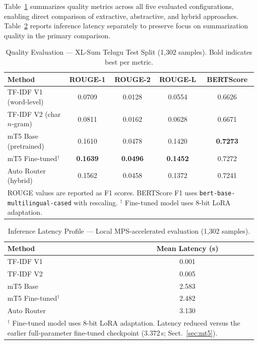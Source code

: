 \documentclass[runningheads]{llncs}
\begin{document}
Table~\ref{tab:main} summarizes quality metrics across all
five evaluated configurations, enabling direct comparison
of extractive, abstractive, and hybrid approaches.
Table~\ref{tab:latency} reports inference latency
separately to preserve focus on summarization quality in
the primary comparison.

\begin{table}[!htbp]
\centering
\caption{Quality Evaluation --- XL-Sum Telugu Test Split
(1,302 samples). Bold indicates best per metric.}
\label{tab:main}
\scriptsize
\setlength{\tabcolsep}{3.5pt}
\begin{tabular}{p{3.5cm}cccc}
\toprule
\textbf{Method}
& \textbf{ROUGE-1}
& \textbf{ROUGE-2}
& \textbf{ROUGE-L}
& \textbf{BERTScore} \\
\midrule
TF-IDF V1 (word-level)
& 0.0709 & 0.0128 & 0.0554 & 0.6626 \\

TF-IDF V2 (char $n$-gram)
& 0.0811 & 0.0162 & 0.0628 & 0.6671 \\

mT5 Base (pretrained)
& 0.1610 & 0.0478 & 0.1420 & \textbf{0.7273} \\

mT5 Fine-tuned$^\dagger$
& \textbf{0.1639}
& \textbf{0.0496}
& \textbf{0.1452}
& 0.7272 \\

Auto Router (hybrid)
& 0.1562 & 0.0458 & 0.1372 & 0.7241 \\
\midrule
\multicolumn{5}{p{11.2cm}}{\footnotesize
ROUGE values are reported as F1 scores.
BERTScore F1 uses \texttt{bert-base-multilingual-cased} with rescaling.
$^\dagger$ Fine-tuned model uses 8-bit LoRA adaptation.}\\
\bottomrule
\end{tabular}
\end{table}

\begin{table}[!htbp]
\centering
\caption{Inference Latency Profile --- Local MPS-accelerated evaluation (1,302 samples).}
\label{tab:latency}
\scriptsize
\setlength{\tabcolsep}{6pt}
\begin{tabular}{p{4.2cm}c}
\toprule
\textbf{Method} & \textbf{Mean Latency (s)} \\
\midrule
TF-IDF V1                & 0.001 \\
TF-IDF V2                & 0.005 \\
mT5 Base                 & 2.583 \\
mT5 Fine-tuned$^\dagger$ & 2.482 \\
Auto Router              & 3.130 \\
\midrule
\multicolumn{2}{p{8.3cm}}{\footnotesize
$^\dagger$ Fine-tuned model uses 8-bit LoRA adaptation.
Latency reduced versus the earlier full-parameter fine-tuned
checkpoint (3.372\,s; Sect.~\ref{sec:mt5}).} \\
\bottomrule
\end{tabular}
\end{table}
\end{document}
